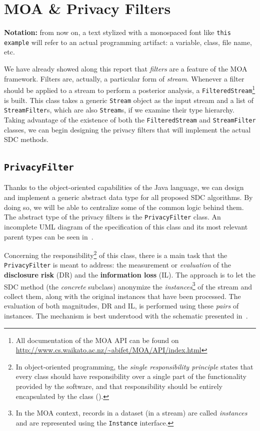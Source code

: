 \section{MOA \& Privacy Filters}
\label{Implementation:PrivacyFilter}

\textbf{Notation:} from now on, a text stylized with a monospaced font like \texttt{this example} will refer to an actual programming artifact: a variable, class, file name, etc.

We have already showed along this report that \textit{filters} are a feature of the MOA framework. Filters are, actually, a particular form of \textit{stream}. Whenever a filter should be applied to a stream to perform a posterior analysis, a \texttt{FilteredStream}\footnote{All documentation of the MOA API can be found on \url{http://www.cs.waikato.ac.nz/~abifet/MOA/API/index.html}} is built. This class takes a generic \texttt{Stream} object as the input stream and a list of \texttt{StreamFilter}s, which are also \texttt{Stream}s, if we examine their type hierarchy. Taking advantage of the existence of both the \texttt{FilteredStream} and \texttt{StreamFilter} classes, we can begin designing the privacy filters that will implement the actual SDC methods.

\subsection{\texttt{PrivacyFilter}}
\label{Implementation:PrivacyFilter:PrivacyFilter}

Thanks to the object-oriented capabilities of the Java language, we can design and implement a generic abstract data type for all proposed SDC algorithms. By doing so, we will be able to centralize some of the common logic behind them. The abstract type of the privacy filters is the \texttt{PrivacyFilter} class. An incomplete UML diagram of the specification of this class and its most relevant parent types can be seen in~.

Concerning the responsibility\footnote{In object-oriented programming, the \textit{single responsibility principle} states that every class should have responsibility over a single part of the functionality provided by the software, and that responsibility should be entirely encapsulated by the class (\citet{web:SOLID}).} of this class, there is a main task that the \texttt{PrivacyFilter} is meant to address: the measurement or \textit{evaluation} of the \textbf{disclosure risk} (DR) and the \textbf{information loss} (IL). The approach is to let the SDC method (the \textit{concrete} subclass) anonymize the \textit{instances}\footnote{In the MOA context, records in a dataset (in a stream) are called \textit{instances} and are represented using the \texttt{Instance} interface.} of the stream and collect them, along with the original instances that have been processed. The evaluation of both magnitudes, DR and IL, is performed using these \textit{pairs} of instances. The mechanism is best understood with the schematic presented in~.


